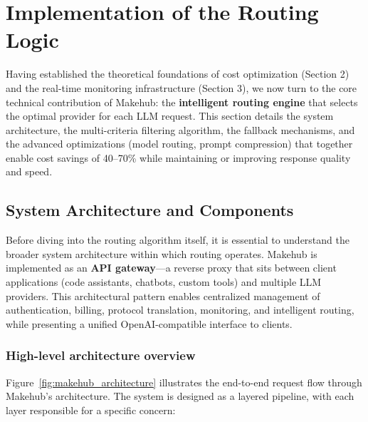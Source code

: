 \documentclass[english]{article}
\begin{document}
\newpage

\section{Implementation of the Routing Logic}

Having established the theoretical foundations of cost optimization (Section 2) and the real-time monitoring infrastructure (Section 3), we now turn to the core technical contribution of Makehub: the \textbf{intelligent routing engine} that selects the optimal provider for each LLM request. This section details the system architecture, the multi-criteria filtering algorithm, the fallback mechanisms, and the advanced optimizations (model routing, prompt compression) that together enable cost savings of 40--70\% while maintaining or improving response quality and speed.

\subsection{System Architecture and Components}

Before diving into the routing algorithm itself, it is essential to understand the broader system architecture within which routing operates. Makehub is implemented as an \textbf{API gateway}—a reverse proxy that sits between client applications (code assistants, chatbots, custom tools) and multiple LLM providers. This architectural pattern enables centralized management of authentication, billing, protocol translation, monitoring, and intelligent routing, while presenting a unified OpenAI-compatible interface to clients.

\subsubsection{High-level architecture overview}

Figure~\ref{fig:makehub_architecture} illustrates the end-to-end request flow through Makehub's architecture. The system is designed as a layered pipeline, with each layer responsible for a specific concern:
\end{document}
